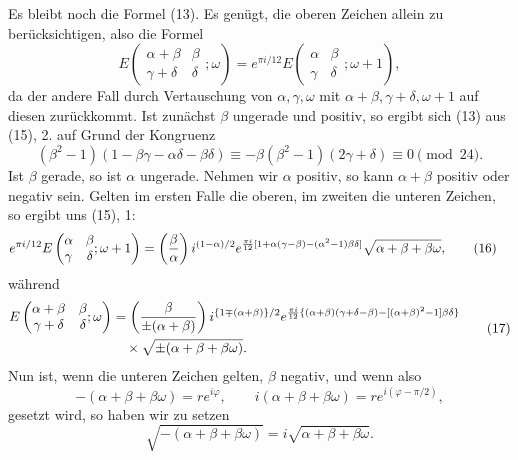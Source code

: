 \documentclass[11pt]{article}
\providecommand{\Jac}[2]{\left(\frac{#1}{#2}\right)}
\begin{document}
Es bleibt noch die Formel (13). Es genügt, die oberen Zeichen allein zu berücksichtigen, also die Formel
\[
E\left(\begin{matrix}\alpha+\beta&\beta\\ \gamma+\delta&\delta\end{matrix};\omega\right)
=e^{\pi i/12}E\left(\begin{matrix}\alpha&\beta\\ \gamma&\delta\end{matrix};\omega+1\right),
\]
da der andere Fall durch Vertauschung von $\alpha,\gamma,\omega$ mit $\alpha+\beta,\gamma+\delta,
\omega+1$ auf diesen zurückkommt. Ist zunächst $\beta$ ungerade und positiv, so ergibt sich (13) aus (15), 2. auf Grund der Kongruenz
\[
(\beta^2-1)(1-\beta\gamma-\alpha\delta-\beta\delta)
\equiv-\beta(\beta^2-1)(2\gamma+\delta)\equiv0\pmod{24}.
\]
Ist $\beta$ gerade, so ist $\alpha$ ungerade. Nehmen wir $\alpha$ positiv, so kann $\alpha+\beta$ positiv oder negativ sein. Gelten im ersten Falle die oberen, im zweiten die unteren Zeichen, so ergibt uns (15), 1:
\begin{align}
e^{\pi i/12}E\left(\begin{matrix}\alpha&\beta\\ \gamma&\delta\end{matrix};\omega+1\right)
&=\Jac{\beta}{\alpha}i^{(1-\alpha)/2}
 e^{{\pi i\over12}[1+\alpha(\gamma-\beta)-(\alpha^2-1)\beta\delta]}
\sqrt{\alpha+\beta+\beta\omega}, \tag{16}
\end{align}
während
\begin{equation}
\begin{aligned}
E\left(\begin{matrix}\alpha+\beta&\beta\\ \gamma+\delta&\delta\end{matrix};\omega\right)
&=\Jac{\beta}{\pm(\alpha+\beta)}
 i^{\{1\mp(\alpha+\beta)\}/2}
 e^{{\pi i\over12}\{(\alpha+\beta)(\gamma+\delta-\beta)-[(\alpha+\beta)^2-1]\beta\delta\}}\\
&\quad\times \sqrt{\pm(\alpha+\beta+\beta\omega)} .
\end{aligned}
\tag{17}
\end{equation}
Nun ist, wenn die unteren Zeichen gelten, $\beta$ negativ, und wenn also
\[
-(\alpha+\beta+\beta\omega)=re^{i\varphi},
\qquad
 i(\alpha+\beta+\beta\omega)=re^{i(\varphi-\pi/2)},
\]
gesetzt wird, so haben wir zu setzen
\[
\sqrt{-(\alpha+\beta+
\beta\omega)}=i\sqrt{\alpha+\beta+\beta\omega}.
\]
\end{document}
